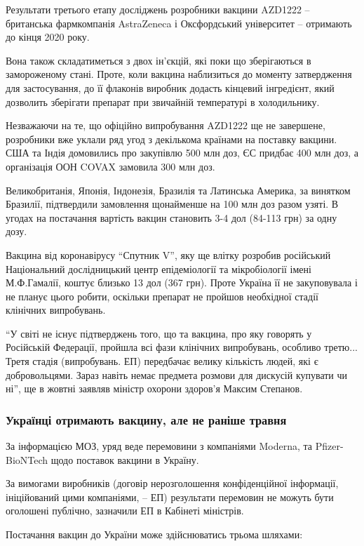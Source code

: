 Результати третього етапу досліджень розробники вакцини AZD1222 – британська
фармкомпанія AstraZeneca і Оксфордський університет – отримають до кінця 2020
року.

Вона також складатиметься з двох ін’єкцій, які поки що зберігаються в
замороженому стані. Проте, коли вакцина наблизиться до моменту затвердження для
застосування, до її флаконів виробник додасть кінцевий інгредієнт, який
дозволить зберігати препарат при звичайній температурі в холодильнику.

Незважаючи на те, що офіційно випробування AZD1222 ще не завершене, розробники
вже уклали ряд угод з декількома країнами на поставку вакцини. США та Індія
домовились про закупівлю 500 млн доз, ЄС придбає 400 млн доз, а організація ООН
COVAX замовила 300 млн доз.

Великобританія, Японія, Індонезія, Бразилія та Латинська Америка, за винятком
Бразилії, підтвердили замовлення щонайменше на 100 млн доз разом узяті. В
угодах на постачання вартість вакцин становить 3-4 дол (84-113 грн) за одну
дозу.

Вакцина від коронавірусу \enquote{Спутник V}, яку ще влітку розробив російський
Національний дослідницький центр епідеміології та мікробіології імені
М.Ф.Гамалії, коштує близько 13 дол (367 грн). Проте Україна її не закуповувала і
не планує цього робити, оскільки препарат не пройшов необхідної стадії
клінічних випробувань.

\enquote{У світі не існує підтверджень того, що та вакцина, про яку говорять у
Російській Федерації, пройшла всі фази клінічних випробувань, особливо третю...
Третя стадія (випробувань. \dshM ЕП) передбачає велику кількість людей, які є
добровольцями. Зараз навіть немає предмета розмови для дискусій \dshM купувати чи
ні}, \dshM ще в жовтні заявляв міністр охорони здоров'я Максим Степанов. 

\subsubsection{Українці отримають вакцину, але не раніше травня}

За інформацією МОЗ, уряд веде перемовини з компаніями Moderna, та
Pfizer-BioNTech щодо поставок вакцини в Україну.

За вимогами виробників (договір нерозголошення конфіденційної інформації,
ініційований цими компаніями, – ЕП) результати перемовин не можуть бути
оголошені публічно, зазначили ЕП в Кабінеті міністрів.

Постачання вакцин до України може здійснюватись трьома шляхами:

